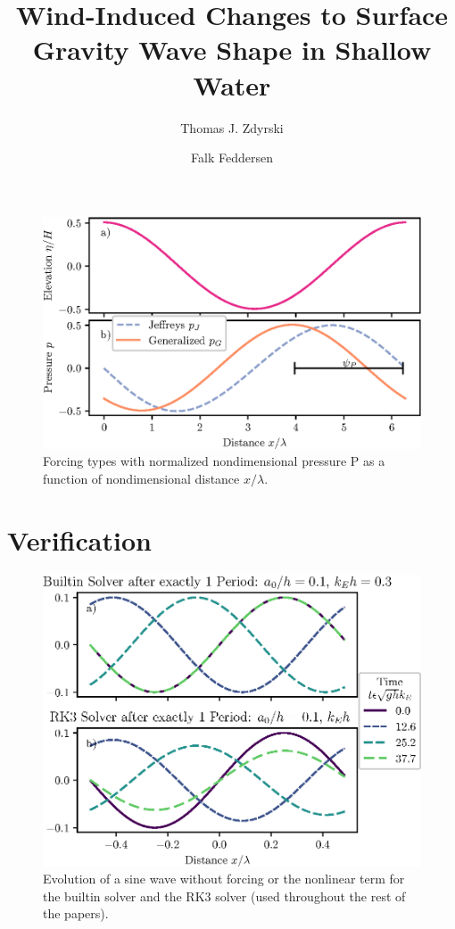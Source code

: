 \documentclass{jfm}
\title{Wind-Induced Changes to Surface Gravity Wave Shape in Shallow Water}
\author{Thomas J. Zdyrski \and Falk Feddersen}
\let\Oldsection\section
\renewcommand{\section}{\FloatBarrier\Oldsection}
\begin{document}
\begin{figure}
  \centering
  \includegraphics{Forcing-Types.eps}
  \caption{
    Forcing types with normalized nondimensional pressure P as a
    function of nondimensional distance $x/\lambda$.
  }
\end{figure}

\section{Verification}
\begin{figure}
  \centering
  \includegraphics{TrigVerf.eps}
  \caption{
    Evolution of a sine wave without forcing or the nonlinear term for
    the builtin solver and the RK3 solver (used throughout the rest of
    the papers).
  }
\end{figure}
\end{document}
